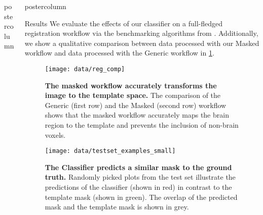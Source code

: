 \begin{frame}
\begin{columns}
\begin{column}{.42\textwidth}
\begin{beamercolorbox}[center]{postercolumn}
\begin{minipage}{.98\textwidth}
{                        }

                    \end{minipage}
                \end{beamercolorbox}
            \end{column}
            \begin{column}{.59\textwidth}
                \begin{beamercolorbox}[center]{postercolumn}
                    \begin{minipage}{.98\textwidth} %
                        \parbox[t][\columnheight]{\textwidth}{ %


                            \begin{myblock}{Results}
                                We evaluate the effects of our classifier on a full-fledged registration workflow via the benchmarking algorithms from \cite{irsabi}.
                                Additionally, we show a qualitative comparison between data processed with our Masked workflow and data processed with the Generic workflow in \cref{reg_comp}.
                                \begin{figure}
                                    \texttt{[image: data/reg\_comp]}
                                    \caption{\textbf{The masked workflow accurately transforms the image to the template space.} The comparison of the Generic (first row) and the Masked (second row) workflow shows that the masked workflow accurately maps the brain region to the template and prevents the inclusion of non-brain voxels.}
                                    \label{reg_comp}
                                \end{figure}

                                \begin{figure}
                                    \texttt{[image: data/testset\_examples\_small]}
                                    \caption{\textbf{The Classifier predicts a similar mask to the ground truth.}
                                    Randomly picked plots from the test set illustrate the predictions of the classifier (shown in red) in contrast to the template mask (shown in green).
                                    The overlap of the predicted mask and the template mask is shown in grey.}
                                \end{figure}



\end{myblock}}
\end{minipage}
\end{beamercolorbox}
\end{column}
\end{columns}
\end{frame}
